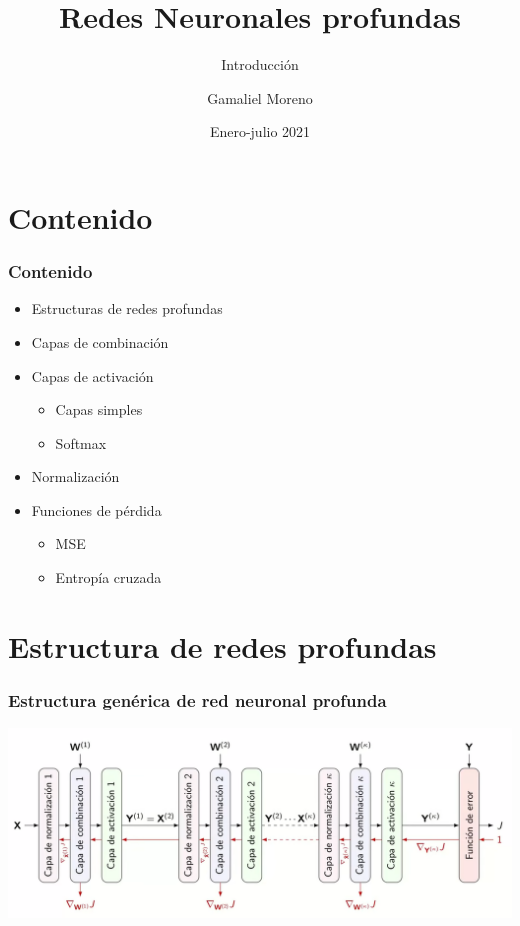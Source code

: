 \documentclass[svgnames,12pt,aspectratio=149]{beamer}
\author{Gamaliel Moreno}
\title{Redes Neuronales profundas}
\subtitle{Introducción}
\date{Enero-julio 2021}
\institute{\url{gamalielmch@uaz.edu.mx}}
\begin{document}
\begin{frame}[plain]
  \titlepage
\end{frame}
\section{Contenido}
\begin{frame}
  \frametitle{Contenido}

  \begin{itemize}
  \item Estructuras  de redes profundas
  \item Capas de combinación 
  \item Capas de activación
  \begin{itemize}
  \item Capas simples
  \item Softmax
  \end{itemize}
  \item Normalización
  \item Funciones de pérdida
  \begin{itemize}
  \item MSE
  \item Entropía cruzada
  \end{itemize}
  \end{itemize}
\end{frame}
\section{Estructura de redes profundas}
\begin{frame}
  \frametitle{Estructura genérica de red neuronal profunda}
  \includegraphics[width=\textwidth]{im1}
\end{frame}
\end{document}
